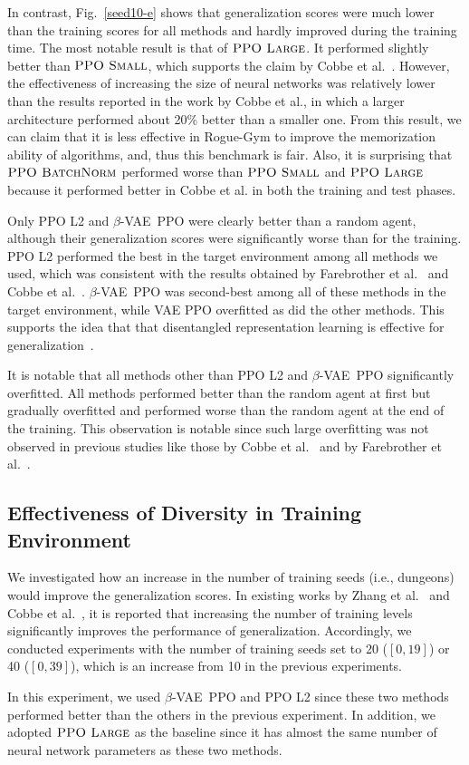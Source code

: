 \documentclass[conference]{IEEEtran}
\newcommand\zhang{Zhang et al.~\cite{Zhang1804}}
\newcommand\cobbe{Cobbe et al.~\cite{Coinrun}}
\newcommand\cobbens{Cobbe et al.} %
\newcommand\fare{Farebrother et al.~\cite{GeneralizeDQN}}
\newcommand\ppos{$\textsc{PPO Small}$}
\newcommand\ppol{$\textsc{PPO Large}$}
\newcommand\ppob{$\textsc{PPO BatchNorm}$}
\newcommand\bvae{$\beta$-VAE}
\newcommand\bppo{\bvae~PPO}
\begin{document}
In contrast, Fig.~\ref{seed10-e} shows that generalization scores were
much lower than the training scores for all methods and hardly improved
during the training time.
The most notable result is that of \ppol{}.
It performed slightly better than \ppos{}, which supports the claim by
\cobbe{}. However, the effectiveness of increasing the size of neural
networks was relatively lower than the results reported in the work by
\cobbens{}, in which a larger architecture performed about 20\% better
than a smaller one.
From this result, we can claim that it is less effective in Rogue-Gym to
improve the memorization ability of algorithms, and, thus this benchmark
is fair.
Also, it is surprising that \ppob{} performed worse than \ppos{} and
\ppol{} because it performed better in \cobbens{} in both the training
and test phases.

Only PPO L2 and \bppo{} were clearly better than a random agent, although
their generalization scores were significantly worse than for the
training.
PPO L2 performed the best in the target environment among all methods we
used, which was consistent with the results obtained by \fare{} and
\cobbe{}.
\bppo{} was second-best among all of these methods in the target
environment, while VAE PPO overfitted as did the other methods.
This supports the idea that that disentangled representation learning is
effective for generalization~\cite{DARLA}.

It is notable that all methods other than PPO L2 and  \bppo{}
significantly overfitted.
All methods performed better than the random agent at first but
gradually overfitted and performed worse than the random agent at the
end of the training.
This observation is notable since such large overfitting was not
observed in previous studies like those by \cobbe{} and by \fare{}.

\subsection{Effectiveness of Diversity in Training Environment}
We investigated how an increase in the number of training seeds
(i.e., dungeons) would improve the generalization scores.
In existing works by \zhang{} and \cobbe{}, it is reported that
increasing the number of training levels significantly improves the
performance of generalization.
Accordingly, we conducted experiments with the number of training seeds
set to 20 ($[0, 19]$) or 40 ($[0, 39]$), which is an increase from 10 in
the previous experiments.

In this experiment, we used \bppo{} and PPO L2 since these two methods
performed better than the others in the previous experiment.
In addition, we adopted \ppol{} as the baseline since it has almost the
same number of neural network parameters as these two methods.
\end{document}
